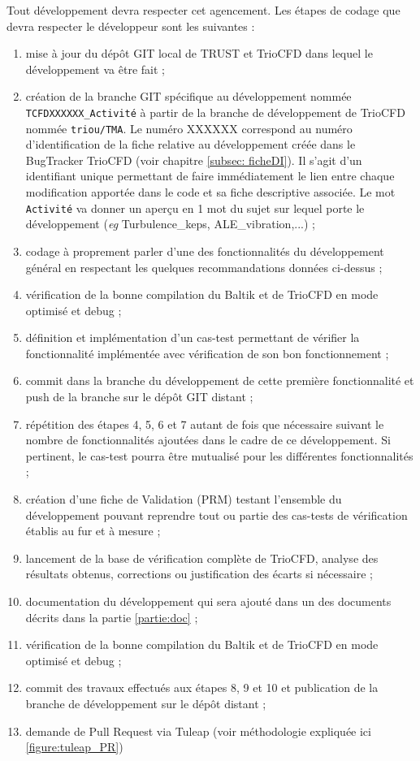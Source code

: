 Tout développement devra respecter cet agencement. Les étapes de codage que devra respecter le développeur sont les suivantes :
\begin{enumerate}
   \item mise à jour du dépôt GIT local de TRUST et TrioCFD dans lequel le développement va être fait ;
   \item création de la branche GIT spécifique au développement nommée \texttt{TCFDXXXXXX\_Activité} à partir de la branche de développement de TrioCFD nommée \texttt{triou/TMA}. Le numéro XXXXXX correspond au numéro d'identification de la fiche relative au développement créée dans le BugTracker TrioCFD (voir chapitre \ref{subsec: ficheDI}). Il s'agit d'un identifiant unique permettant de faire immédiatement le lien entre chaque modification apportée dans le code et sa fiche descriptive associée. Le mot \texttt{Activité} va donner un aperçu en 1 mot du sujet sur lequel porte le développement (\textit{eg} Turbulence\_keps, ALE\_vibration,...) ;
   \item codage à proprement parler d'une des fonctionnalités du développement général en respectant les quelques recommandations données ci-dessus ;
   \item vérification de la bonne compilation du Baltik et de TrioCFD en mode optimisé et debug ;
   \item définition et implémentation d'un cas-test permettant de vérifier la fonctionnalité implémentée avec vérification de son bon fonctionnement ;
   \item commit dans la branche du développement de cette première fonctionnalité et push de la branche sur le dépôt GIT distant ;
   \item répétition des étapes 4, 5, 6  et 7 autant de fois que nécessaire suivant le nombre de fonctionnalités ajoutées dans le cadre de ce développement. Si pertinent, le cas-test pourra être mutualisé pour les différentes fonctionnalités ;
   \item création d'une fiche de Validation (PRM) testant l'ensemble du développement pouvant reprendre tout ou partie des cas-tests de vérification établis au fur et à mesure ;
   \item lancement de la base de vérification complète de TrioCFD, analyse des résultats obtenus, corrections ou justification des écarts si nécessaire ;
   \item documentation du développement qui sera ajouté dans un des documents décrits dans la partie \ref{partie:doc} ;
   \item vérification de la bonne compilation du Baltik et de TrioCFD en mode optimisé et debug ;
   \item commit des travaux effectués aux étapes 8, 9 et 10 et publication de la branche de développement sur le dépôt distant ;
   \item demande de Pull Request via Tuleap (voir méthodologie expliquée ici \ref{figure:tuleap_PR})
\end{enumerate}
